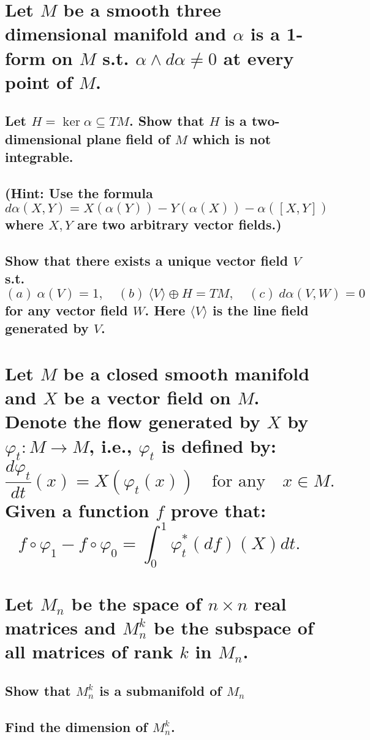 \documentclass[10pt]{article}
\newcommand{\st}{s.t. }
\newcommand{\hint}[1]{(Hint: #1)}
\begin{document}
 

\section{Let $M$ be a smooth three dimensional manifold and $\alpha$ is a 1-form on $M$ \st $\alpha
  \wedge d \alpha \neq 0$ at every point of $M$.}

\subsection{Let $H = \ker \alpha \subseteq TM$. Show that $H$ is a two-dimensional plane field of
  $M$ which is not integrable. \\\\\hint{Use the formula $d\alpha(X,Y) =
    X(\alpha(Y))-Y(\alpha(X))-\alpha([X,Y])$ where $X,Y$ are two arbitrary vector fields.}}

\subsection{Show that there exists a unique vector field $V$ \st
$$(a)\ \alpha(V) =1, \quad (b)\ \langle V \rangle \oplus H = TM ,  \quad (c)\ d\alpha(V,W) =0$$
for any vector field $W$. Here $\langle V \rangle$ is the line field generated by $V$.}

\section{Let $M$ be a closed smooth manifold and $X$ be a vector field on $M$. Denote the flow
  generated by $X$ by $\varphi_t: M \to M$, i.e., $\varphi_t$ is defined by:
$$\frac{d \varphi_t}{dt}(x) = X( \varphi_t (x))\quad\mbox{for any}\quad x \in M. $$
Given a function $f$ prove that: $$f \circ \varphi_1 - f \circ \varphi_0 = \int_0^1
\varphi^*_t(df)(X)dt. $$}

\section{Let $M_n$ be the space of $n \times n$ real matrices and $M^k_n$ be the subspace of all
  matrices of rank $k$ in $M_n$.}

\subsection{Show that $M^k_n$ is a submanifold of $M_n$}

\subsection{Find the dimension of $M^k_n$.}
\end{document}
